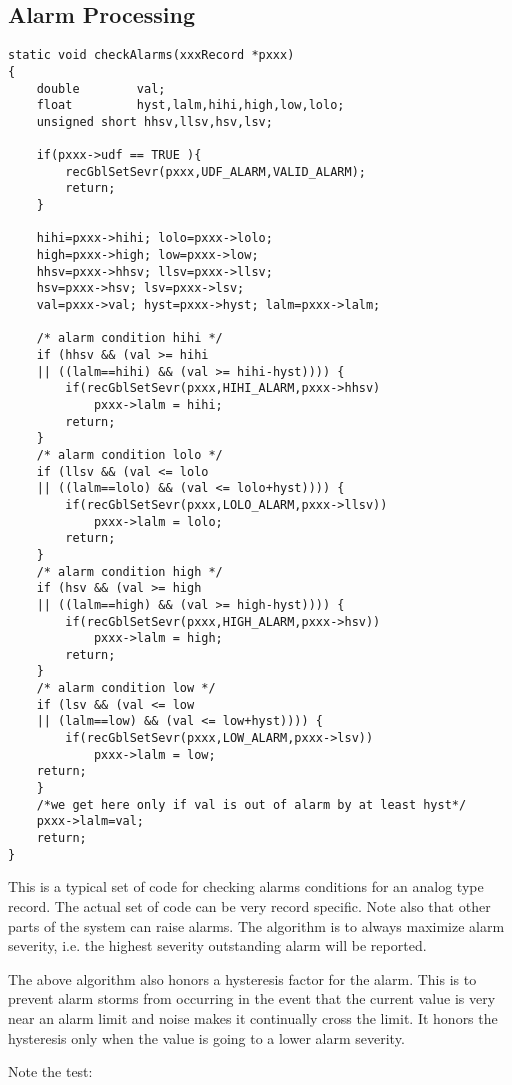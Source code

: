 \subsection{Alarm Processing}

\begin{verbatim}
static void checkAlarms(xxxRecord *pxxx)
{
    double        val;
    float         hyst,lalm,hihi,high,low,lolo;
    unsigned short hhsv,llsv,hsv,lsv;

    if(pxxx->udf == TRUE ){
        recGblSetSevr(pxxx,UDF_ALARM,VALID_ALARM);
        return;
    }

    hihi=pxxx->hihi; lolo=pxxx->lolo;
    high=pxxx->high; low=pxxx->low;
    hhsv=pxxx->hhsv; llsv=pxxx->llsv;
    hsv=pxxx->hsv; lsv=pxxx->lsv;
    val=pxxx->val; hyst=pxxx->hyst; lalm=pxxx->lalm;

    /* alarm condition hihi */
    if (hhsv && (val >= hihi 
    || ((lalm==hihi) && (val >= hihi-hyst)))) {
        if(recGblSetSevr(pxxx,HIHI_ALARM,pxxx->hhsv)
            pxxx->lalm = hihi;
        return;
    }
    /* alarm condition lolo */
    if (llsv && (val <= lolo 
    || ((lalm==lolo) && (val <= lolo+hyst)))) {
        if(recGblSetSevr(pxxx,LOLO_ALARM,pxxx->llsv))
            pxxx->lalm = lolo;
        return;
    }
    /* alarm condition high */
    if (hsv && (val >= high 
    || ((lalm==high) && (val >= high-hyst)))) {
        if(recGblSetSevr(pxxx,HIGH_ALARM,pxxx->hsv))
            pxxx->lalm = high;
        return;
    }
    /* alarm condition low */
    if (lsv && (val <= low 
    || (lalm==low) && (val <= low+hyst)))) {
        if(recGblSetSevr(pxxx,LOW_ALARM,pxxx->lsv))
            pxxx->lalm = low;
    return;
    }
    /*we get here only if val is out of alarm by at least hyst*/
    pxxx->lalm=val;
    return;
}
\end{verbatim}This is a typical set of code for checking alarms conditions for an analog type record. The actual set of code can be very 
record specific. Note also that other parts of the system can raise alarms. The algorithm is to always maximize alarm 
severity, i.e. the highest severity outstanding alarm will be reported.

The above algorithm also honors a hysteresis factor for the alarm. This is to prevent alarm storms from occurring in the 
event that the current value is very near an alarm limit and noise makes it continually cross the limit. It honors the 
hysteresis only when the value is going to a lower alarm severity.

Note the test:

